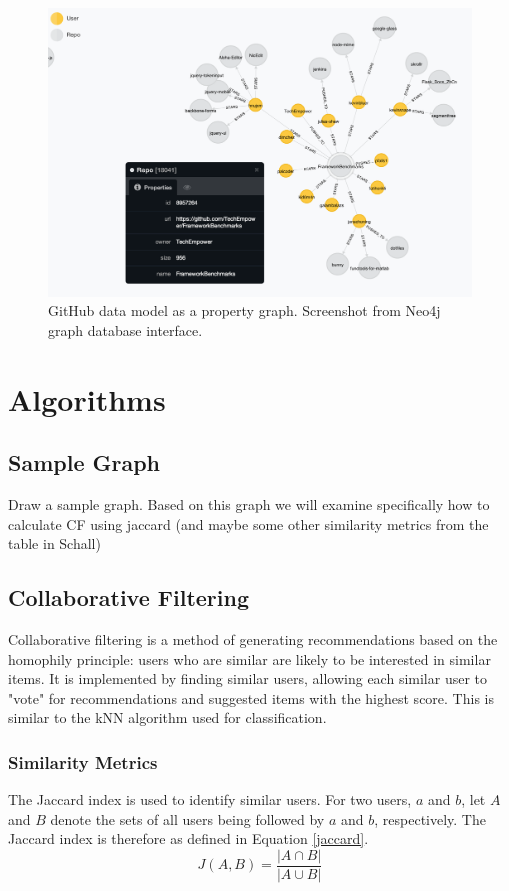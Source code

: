 \begin{figure}[ht]
\vskip 0.2in
\begin{center}
\centerline{\includegraphics[width=\columnwidth]{images/neo_screenshot.png}}
\caption{GitHub data model as a property graph. Screenshot from Neo4j graph database interface.}
\label{screenshot-data}
\end{center}
\vskip -0.2in
\end{figure} 

\section{Algorithms}

\subsection{Sample Graph}
Draw a sample graph. Based on this graph we will examine specifically how to calculate CF using jaccard (and maybe some other similarity metrics from the table in Schall)

\subsection{Collaborative Filtering}
Collaborative filtering is a method of generating recommendations based on the homophily principle: users who are similar are likely to be interested in similar items. It is implemented by finding similar users, allowing each similar user to "vote" for recommendations and suggested items with the highest score. This is similar to the kNN algorithm used for classification.\cite{cf}
\subsubsection{Similarity Metrics}
The Jaccard index is used to identify similar users. For two users, $a$ and $b$, let $A$ and $B$ denote the sets of all users being followed by $a$ and $b$, respectively. The Jaccard index is therefore as defined in Equation \ref{jaccard}.
\begin{equation}
\label{jaccard}
J(A,B) = \frac{|A \cap B|}{|A \cup B|}
\end{equation}

